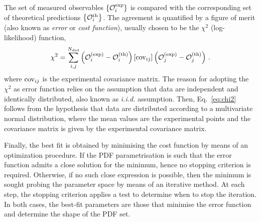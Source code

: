 The set of measured observables $\left\{ \mathcal{O}^{\textrm{exp}}_i \right\}$ is compared with the corresponding set of theoretical predictions $\left\{ \mathcal{O}^{\textrm{th}}_i \right\}$. The agreement is quantified by a figure of merit (also known as \textit{error} or \textit{cost function}), usually chosen to be the $\chi^2$ (log-likelihood) function,
\begin{equation}
  \chi^2 = \sum_{i,j}^{N_{dat}} \left( \mathcal{O}_{i}^{\textrm{(exp)}} - \mathcal{O}_{i}^{\textrm{(th)}} \right) \left[ \textrm{cov}_{ij} \right] \left( \mathcal{O}_{j}^{\textrm{(exp)}} - \mathcal{O}_{j}^{\textrm{(th)}}  \right) \,.
  \label{eq:chi2}
\end{equation}  
where $\textrm{cov}_{ij}$ is the experimental covariance matrix. The reason for adopting the $\chi^2$ as error function relies on the assumption that data are independent and identically distributed, also known as \textit{i.i.d.} assumption. Then, Eq.~\eqref{eq:chi2} follows from the hypothesis that data are distributed according to a multivariate normal distribution, where the mean values are the experimental points and the covariance matrix is given by the experimental covariance matrix.%

Finally, the best fit is obtained by minimising the cost function by means of an optimization procedure. If the PDF parametrisation is such that the error function admits a close solution for the minimum, hence no stopping criterion is required. Otherwise, if no such close expression is possible, then the minimum is sought probing the parameter space by means of an iterative method. At each step, the stopping criterion applies a test to determine when to stop the iteration. In both cases, the best-fit parameters are those that minimise the error function and determine the shape of the PDF set.%


